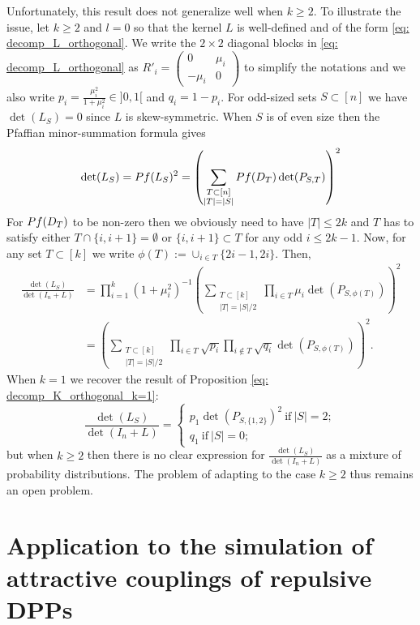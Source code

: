 \documentclass{article}
\numberwithin{equation}{section}
\renewcommand{\leq}{\leqslant}
\renewcommand{\geq}{\geqslant}
\newcommand{\defeq}{:=}
\newcommand{\Pf}{\textnormal{Pf}}
\theoremstyle{plain}
\begin{document}
\noindent Unfortunately, this result does not generalize well when $k\geq 2$. To illustrate the issue, let $k\geq 2$ and $l=0$ so that the kernel $L$ is well-defined and of the form \eqref{eq: decomp_L_orthogonal}. We write the $2\times 2$ diagonal blocks in \eqref{eq: decomp_L_orthogonal} as $R'_i=\begin{pmatrix} 0 & \mu_i \\ -\mu_i & 0\end{pmatrix}$
to simplify the notations and we also write $p_i=\frac{\mu_i^2}{1+\mu_i^2}\in]0, 1[$ and $q_i=1-p_i$. For odd-sized sets $S\subset [n]$ we have $\det(L_S)=0$ since $L$ is skew-symmetric. When $S$ is of even size then the Pfaffian minor-summation formula \cite{Ishikawa} gives
\[\det(L_S)=\Pf(L_S)^2=\left(\sum_{\substack{T\subset [n]\\ |T|=|S|}}\Pf(D_T)\det(P_{S, T})\right)^2\]
For $\Pf(D_T)$ to be non-zero then we obviously need to have $|T|\leq 2k$ and $T$ has to satisfy either $T\cap\{i, i+1\}=\emptyset$ or $\{i, i+1\}\subset T$ for any odd $i\leq 2k-1$.
Now, for any set $T\subset [k]$ we write $\phi(T)\defeq\cup_{i\in T}\{2i-1, 2i\}$. Then,
\begin{align*}
\frac{\det(L_S)}{\det(I_n+L)}&=\prod_{i=1}^k(1+\mu_i^2)^{-1}\left(\sum_{\substack{T\subset [k]\\ |T|=|S|/2}}\prod_{i\in T}\mu_i\det(P_{S, \phi(T)})\right)^2\\
&=\left(\sum_{\substack{T\subset [k]\\ |T|=|S|/2}}\prod_{i\in T}\sqrt{p_i}\prod_{i\notin T}\sqrt{q_i}\det(P_{S, \phi(T)})\right)^2.
\end{align*}
When $k=1$ we recover the result of Proposition \ref{eq: decomp_K_orthogonal_k=1}:
\[\frac{\det(L_S)}{\det(I_n+L)}=\left\{\begin{array}{l}
p_1\det(P_{S, \{1, 2\}})^2~\mbox{if}~|S|=2;\\
q_1~\mbox{if}~|S|=0;
\end{array}\right.\]
but when $k\geq 2$ then there is no clear expression for $\frac{\det(L_S)}{\det(I_n+L)}$ as a mixture of probability distributions. The problem of adapting \cite[Algorithm 4.4.2]{Hough} to the case $k\geq 2$ thus remains an open problem.

\section{Application to the simulation of attractive couplings of repulsive DPPs}\label{sec: Simulation}
\end{document}
